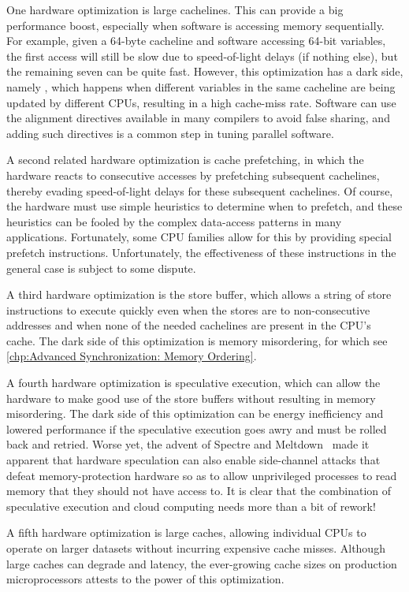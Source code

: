 One hardware optimization is large cachelines.
This can provide a big performance boost, especially when software is
accessing memory sequentially.
For example, given a 64-byte cacheline and software accessing 64-bit
variables, the first access will still be slow due to speed-of-light
delays (if nothing else), but the remaining seven can be quite fast.
However, this optimization has a dark side, namely ,
which happens when different variables in the same cacheline are
being updated by different CPUs, resulting in a high cache-miss rate.
Software can use the alignment directives available in many compilers
to avoid false sharing, and adding such directives is a common step
in tuning parallel software.

A second related hardware optimization is cache prefetching, in which
the hardware reacts to consecutive accesses by prefetching subsequent
cachelines, thereby evading speed-of-light delays for these
subsequent cachelines.
Of course, the hardware must use simple heuristics to determine when
to prefetch, and these heuristics can be fooled by the complex data-access
patterns in many applications.
Fortunately, some CPU families allow for this by providing special
prefetch instructions.
Unfortunately, the effectiveness of these instructions in the general
case is subject to some dispute.

A third hardware optimization is the store buffer, which allows a string
of store instructions to execute quickly even when the stores are to
non-consecutive addresses and when none of the needed cachelines are
present in the CPU's cache.
The dark side of this optimization is memory misordering, for which see
\cref{chp:Advanced Synchronization: Memory Ordering}.

A fourth hardware optimization is speculative execution, which can
allow the hardware to make good use of the store buffers without
resulting in memory misordering.
The dark side of this optimization can be energy inefficiency and
lowered performance if the speculative execution goes awry and must
be rolled back and retried.
Worse yet, the advent of
Spectre and Meltdown~\cite{JannHorn2018MeltdownSpectre}
made it apparent that hardware speculation can also enable side-channel
attacks that defeat memory-protection hardware so as to allow unprivileged
processes to read memory that they should not have access to.
It is clear that the combination of speculative execution and cloud
computing needs more than a bit of rework!

A fifth hardware optimization is large caches, allowing individual
CPUs to operate on larger datasets without incurring expensive cache
misses.
Although large caches can degrade  and 
{latency}, the ever-growing cache sizes on production microprocessors
attests to the power of this optimization.

